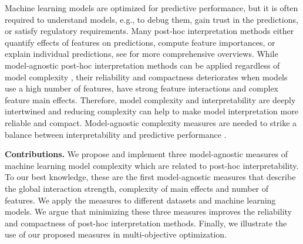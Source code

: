\documentclass[runningheads]{llncs}\usepackage[]{graphicx}\usepackage[]{color}
\begin{document}
Machine learning models are optimized for predictive performance, but it is often required to understand models, e.g., to debug them, gain trust in the predictions, or satisfy regulatory requirements.
Many post-hoc interpretation methods either quantify effects of features on predictions, compute feature importances, or explain individual predictions, see \citep{molnar2019,guidotti2018survey} for more comprehensive overviews.
While model-agnostic post-hoc interpretation methods can be applied regardless of model complexity \citep{ribeiro2016model}, their reliability and compactness deteriorates when models use a high number of features, have strong feature interactions and complex feature main effects.
Therefore, model complexity and interpretability are deeply intertwined and reducing complexity can help to make model interpretation more reliable and compact.
Model-agnostic complexity measures are needed to strike a balance between interpretability and predictive performance \citep{ruping2006learning,bibal2016interpretability}.

\textbf{Contributions.}
We propose and implement three model-agnostic measures of machine learning model complexity which are related to post-hoc interpretability.
To our best knowledge, these are the first model-agnostic measures that describe the global interaction strength, complexity of main effects and number of features.
We apply the measures to different datasets and machine learning models.
We argue that minimizing these three measures improves the reliability and compactness of post-hoc interpretation methods.
Finally, we illustrate the use of our proposed measures in multi-objective optimization.
\end{document}
